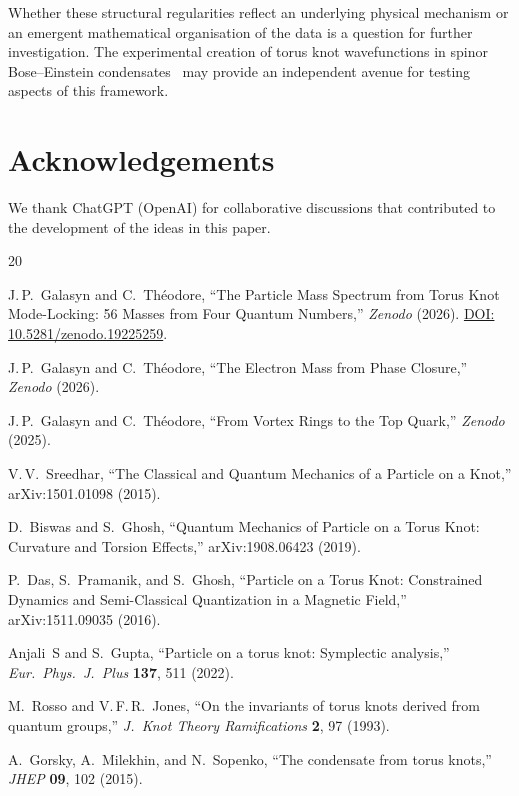 \documentclass[11pt,a4paper]{article}
\begin{document}
Whether these structural regularities reflect an underlying
physical mechanism or an emergent mathematical organisation
of the data is a question for further investigation.
The experimental creation of torus knot wavefunctions in
spinor Bose--Einstein condensates~\cite{Jayaseelan2024}
may provide an independent avenue for testing aspects
of this framework.


\section*{Acknowledgements}

We thank ChatGPT (OpenAI) for collaborative discussions
that contributed to the development of the ideas in this
paper.

\begin{thebibliography}{20}

J.\,P.~Galasyn and C.~Th\'eodore,
``The Particle Mass Spectrum from Torus Knot Mode-Locking:
56 Masses from Four Quantum Numbers,''
\emph{Zenodo} (2026).
\href{https://doi.org/10.5281/zenodo.19225259}{DOI: 10.5281/zenodo.19225259}.

J.\,P.~Galasyn and C.~Th\'eodore,
``The Electron Mass from Phase Closure,''
\emph{Zenodo} (2026).

J.\,P.~Galasyn and C.~Th\'eodore,
``From Vortex Rings to the Top Quark,''
\emph{Zenodo} (2025).

V.\,V.~Sreedhar,
``The Classical and Quantum Mechanics of a Particle on a Knot,''
arXiv:1501.01098 (2015).

D.~Biswas and S.~Ghosh,
``Quantum Mechanics of Particle on a Torus Knot: Curvature and
Torsion Effects,''
arXiv:1908.06423 (2019).

P.~Das, S.~Pramanik, and S.~Ghosh,
``Particle on a Torus Knot: Constrained Dynamics and
Semi-Classical Quantization in a Magnetic Field,''
arXiv:1511.09035 (2016).

Anjali~S and S.~Gupta,
``Particle on a torus knot: Symplectic analysis,''
\emph{Eur.\ Phys.\ J.\ Plus} \textbf{137}, 511 (2022).

M.~Rosso and V.\,F.\,R.~Jones,
``On the invariants of torus knots derived from quantum groups,''
\emph{J.\ Knot Theory Ramifications} \textbf{2}, 97 (1993).

A.~Gorsky, A.~Milekhin, and N.~Sopenko,
``The condensate from torus knots,''
\emph{JHEP} \textbf{09}, 102 (2015).


\end{thebibliography}
\end{document}
